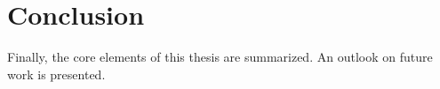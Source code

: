
\chapter{Conclusion}\label{ord:ch6}

Finally, the core elements of this thesis are summarized.
An outlook on future work is presented.


